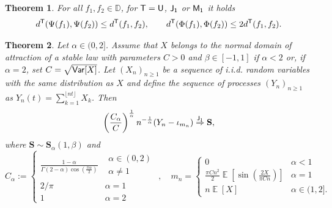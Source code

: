 \documentclass[10pt,a4paper]{amsart}
\newtheorem{thm}{Theorem}
\DeclareMathOperator{\E}{\mathbb{E}}
\begin{document}
\begin{thm}\label{thm:continuity}
	For all $f_1,f_2 \in \mathbb{D}$, for ${\sf T}={\sf U}$, ${\sf J_1}$ or ${\sf M_1}$ it holds
	\begin{equation*}
		d^{{\sf T}}(\Psi(f_1),\Psi(f_2)) \le d^{\sf T}(f_1,f_2), \qquad  d^{\sf T}(\Phi(f_1),\Phi(f_2)) \le 2d^{\sf T}(f_1,f_2).
	\end{equation*}
\end{thm}

\begin{thm}\label{thm:DTa}
	Let $\alpha \in (0,2]$. Assume that $X$ belongs to the normal domain of attraction of a stable law with parameters $C>0$ and $\beta \in [-1,1]$ if $\alpha<2$ or, if $\alpha=2$, set $C=\sqrt{{\sf Var}[X]}$. Let $(X_n)_{n \ge 1}$ be a sequence of i.i.d. random variables with the same distribution as $X$ and define the sequence of processes $(Y_n)_{n \ge 1}$ as  $Y_n(t)=\sum_{k=1}^{\lfloor nt \rfloor}X_k$. Then
	\begin{equation*}
		\left(\frac{C_\alpha}{C}\right)^{\frac{1}{\alpha}}n^{-\frac{1}{\alpha}}(Y_n-\iota_{m_n}) \overset{{\sf J}_1}{\Rightarrow} \mathbf{S},
	\end{equation*}
	where $\mathbf{S} \sim \mathbf{S}_\alpha(1,\beta)$ and
	\begin{equation}\label{eq:Ca}
		C_\alpha:=\begin{cases}
			\displaystyle \frac{1-\alpha}{\Gamma(2-\alpha)\cos\left(\frac{\pi \alpha}{2}\right)} & \displaystyle\substack{\alpha \in (0,2) \\ \alpha \not = 1} \\[7pt]
			\displaystyle 2/\pi & \alpha=1\\
			1 & \alpha=2
		\end{cases},
		\quad m_n=\begin{cases}
			0 & \alpha<1 \\[7pt]
			\displaystyle \frac{\pi Cn^{2}}{2}\E\left[\sin\left(\frac{2X}{\pi Cn}\right)\right] & \alpha=1 \\[7pt]
			n\E[X] & \alpha \in (1,2].
		\end{cases}
	\end{equation}
\end{thm}
\end{document}
